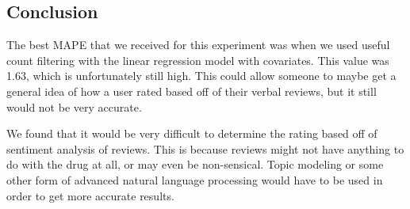 \documentclass{article}
\begin{document}
\subsection{Conclusion}

The best MAPE that we received for this experiment was when we used useful count filtering with the linear regression model with covariates. This value was 1.63, which is unfortunately still high. This could allow someone to maybe get a general idea of how a user rated based off of their verbal reviews, but it still would not be very accurate. 

We found that it would be very difficult to determine the rating based off of sentiment analysis of reviews. This is because reviews might not have anything to do with the drug at all, or may even be non-sensical. Topic modeling or some other form of advanced natural language processing would have to be used in order to get more accurate results.
\end{document}
